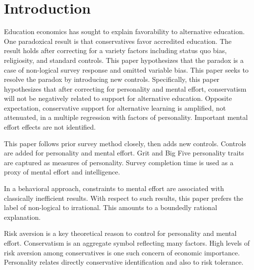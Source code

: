 \documentclass[review]{elsarticle}
\begin{document}
\pagebreak
\linenumbers

\section{Introduction}

Education economics has sought to explain favorability to alternative education.
One paradoxical result is that conservatives favor accredited education\cite{vandivier2020preliminary}.
The result holds after correcting for a variety factors including status quo bias, religiosity, and standard controls.
This paper hypothesizes that the paradox is a case of non-logical survey response and omitted variable bias.
This paper seeks to resolve the paradox by introducing new controls.
Specifically, this paper hypothesizes that after correcting for personality and mental effort,
conservatism will not be negatively related to support for alternative education.
Opposite expectation,
conservative support for alternative learning is amplified,
not attenuated,
in a multiple regression with factors of personality.
Important mental effort effects are not identified.

This paper follows prior survey method closely, then adds new controls.
Controls are added for personality and mental effort.
Grit and Big Five personality traits are captured as measures of personality.
Survey completion time is used as a proxy of mental effort and intelligence.

In a behavioral approach, constraints to mental effort are associated with classically inefficient results.
With respect to such results, this paper prefers the label of non-logical to irrational.
This amounts to a boundedly rational explanation\cite{candela2016vilfredo}.

Risk aversion is a key theoretical reason to control for personality and mental effort.
Conservatism is an aggregate symbol reflecting many factors\cite{hill1997liberal}.
High levels of risk aversion among conservatives is one such concern of economic importance\cite{perhac1996does}.
Personality relates directly conservative identification\cite{chirumbolo2010personality} and also to risk tolerance.
\end{document}
